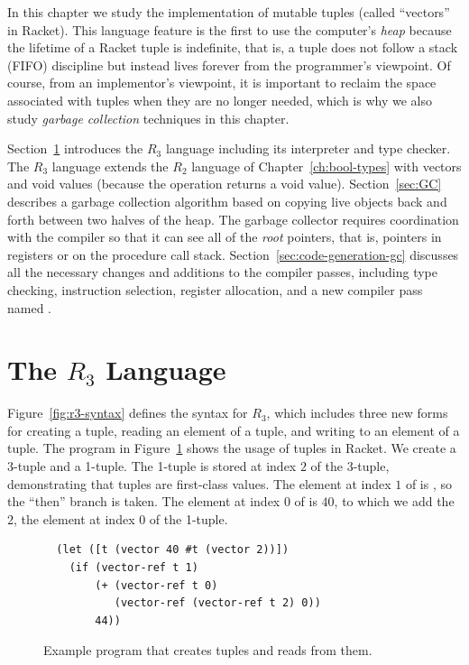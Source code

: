 \documentclass[11pt]{book}
\begin{document}
In this chapter we study the implementation of mutable tuples (called
``vectors'' in Racket). This language feature is the first to use the
computer's \emph{heap} because the lifetime of a Racket tuple is
indefinite, that is, a tuple does not follow a stack (FIFO) discipline
but instead lives forever from the programmer's viewpoint. Of course,
from an implementor's viewpoint, it is important to reclaim the space
associated with tuples when they are no longer needed, which is why we
also study \emph{garbage collection} techniques in this chapter.

Section~\ref{sec:r3} introduces the $R_3$ language including its
interpreter and type checker. The $R_3$ language extends the $R_2$
language of Chapter~\ref{ch:bool-types} with vectors and void values
(because the   operation returns a void
value). Section~\ref{sec:GC} describes a garbage collection algorithm
based on copying live objects back and forth between two halves of the
heap. The garbage collector requires coordination with the compiler so
that it can see all of the \emph{root} pointers, that is, pointers in
registers or on the procedure call stack.
Section~\ref{sec:code-generation-gc} discusses all the necessary
changes and additions to the compiler passes, including type checking,
instruction selection, register allocation, and a new compiler pass
named .

\section{The $R_3$ Language}
\label{sec:r3}

Figure~\ref{fig:r3-syntax} defines the syntax for $R_3$, which
includes three new forms for creating a tuple, reading an element of a
tuple, and writing to an element of a tuple. The program in
Figure~\ref{fig:vector-eg} shows the usage of tuples in Racket. We
create a 3-tuple  and a 1-tuple. The 1-tuple is stored at
index $2$ of the 3-tuple, demonstrating that tuples are first-class
values.  The element at index $1$ of  is , so the
``then'' branch is taken.  The element at index $0$ of  is
$40$, to which we add the $2$, the element at index $0$ of the
1-tuple.

\begin{figure}[tbp]
\begin{lstlisting}
  (let ([t (vector 40 #t (vector 2))])
    (if (vector-ref t 1)
        (+ (vector-ref t 0)
           (vector-ref (vector-ref t 2) 0))
        44))
\end{lstlisting}
\caption{Example program that creates tuples and reads from them.}
\label{fig:vector-eg}
\end{figure}
\end{document}
